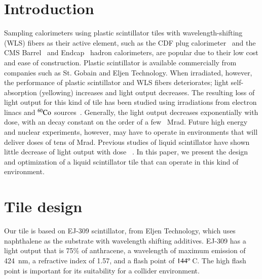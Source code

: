 \documentclass[review]{elsarticle}
\begin{document}
\linenumbers

\section{Introduction}
Sampling calorimeters using plastic scintillator tiles with
wavelength-shifting (WLS) fibers as their active element, such as the CDF plug
calorimeter~\cite{Aota1995557} and the CMS Barrel~\cite{CMSHB} and
Endcap~\cite{HCALTDR1997} hadron calorimeters, are popular due to their
low cost and ease of construction. Plastic scintillator is available
commercially from companies such as St. Gobain and Eljen Technology. When
irradiated, however, the performance of plastic scintillator and WLS
fibers deteriorates; light self-absorption (yellowing) increases and
light output decreases. The resulting loss of light output for this
kind of tile has been studied using irradiations
from electron linacs and ${\rm ^{60}Co}$ sources~\cite{vasken,ByonWagner1993263}.
Generally, the light output decreases exponentially with dose, with an
decay constant on the order of a few~ Mrad. Future high energy and nuclear
experiments, however, may have to operate in environments that will
deliver doses of tens of Mrad.
Previous studies of liquid scintillator have shown little decrease
of light output with dose ~\cite{zornliquid,Klein1967399,berlman}.
In this paper, we present the design
and optimization of a liquid scintillator tile
that can operate in this kind of environment.

\section{Tile design}
\label{sec:design}
Our tile is based on EJ-309 scintillator, from Eljen Technology, which
uses naphthalene as the substrate with wavelength shifting additives.
EJ-309 has a light output that is 75\% of anthracene, a wavelength of
maximum emission of 424~nm, a refractive index of 1.57, and a flash
point of $\rm{144^o}$\,C. The high flash point is important for its
suitability for a collider environment.
\end{document}
